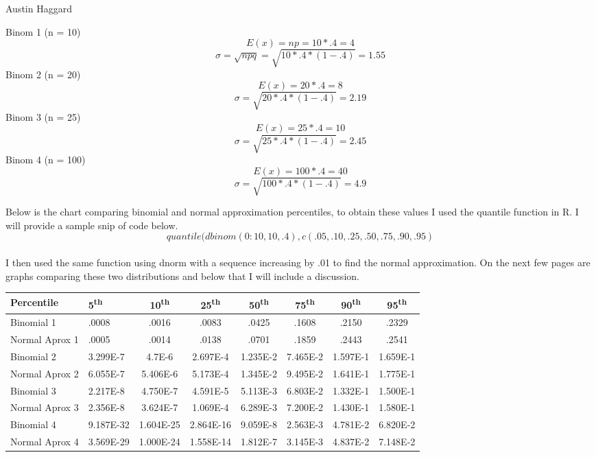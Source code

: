 \documentclass{article}
\begin{document}
\begin{flushright}
Austin Haggard
\end{flushright}
Binom 1 (n = 10)
\[E(x) = np = 10 * .4 = 4\]
\[\sigma = \sqrt{npq} = \sqrt{10 * .4 * (1-.4)} = 1.55\]
Binom 2 (n = 20)
\[E(x) = 20 * .4 = 8\]
\[\sigma = \sqrt{20 * .4*(1 - .4)} = 2.19\]
Binom 3 (n = 25)
\[E(x) = 25 * .4 = 10\]
\[\sigma = \sqrt{25*.4*(1-.4)}= 2.45\]
Binom 4 (n = 100)
\[E(x) = 100 * .4 = 40\]
\[\sigma = \sqrt{100 * .4*(1-.4)}=4.9\]


Below is the chart comparing binomial and normal approximation percentiles, to obtain these values I used the quantile function in R.  I will provide a sample snip of code below.
\[quantile(dbinom(0:10,10,.4), c(.05,.10,.25,.50,.75,.90,.95)\]
\\
I then used the same function using dnorm with a sequence increasing by .01 to find the normal approximation. On the next few pages are graphs comparing these two distributions and below that I will include a discussion.
\begin{center}
\begin{tabular}{|l|l|c|c|c|c|c|c|}
\hline
Percentile & 

5\textsuperscript{th} & 
10\textsuperscript{th} &
25\textsuperscript{th} &
50\textsuperscript{th} &
75\textsuperscript{th} &
90\textsuperscript{th} &
95\textsuperscript{th} \\
\hline

Binomial 1 &
.0008 &
.0016 &
.0083 &
.0425 &
.1608 &
.2150 &
.2329 \\
\hline
Normal Aprox 1 &
.0005 &
.0014 &
.0138 &
.0701 &
.1859 &
.2443 &
.2541 \\
\hline

Binomial 2 &
3.299E-7 &
4.7E-6   &
2.697E-4 &
1.235E-2 &
7.465E-2 &
1.597E-1 &
1.659E-1 \\
\hline

Normal Aprox 2 &
6.055E-7 &
5.406E-6 &
5.173E-4 &
1.345E-2 &
9.495E-2 &
1.641E-1 &
1.775E-1 \\
\hline

Binomial 3 &
2.217E-8 &
4.750E-7 &
4.591E-5 &
5.113E-3 &
6.803E-2 &
1.332E-1 &
1.500E-1 \\
\hline

Normal Aprox 3 &
2.356E-8 &
3.624E-7 &
1.069E-4 &
6.289E-3 &
7.200E-2 &
1.430E-1 &
1.580E-1 \\
\hline

Binomial 4 &
9.187E-32 &
1.604E-25 &
2.864E-16 &
9.059E-8  &
2.563E-3  &
4.781E-2  &
6.820E-2  \\
\hline

Normal Aprox 4 &
3.569E-29 &
1.000E-24 &
1.558E-14 &
1.812E-7  &
3.145E-3  &
4.837E-2  &
7.148E-2  \\
\hline


\end{tabular}
\end{center}
\end{document}
